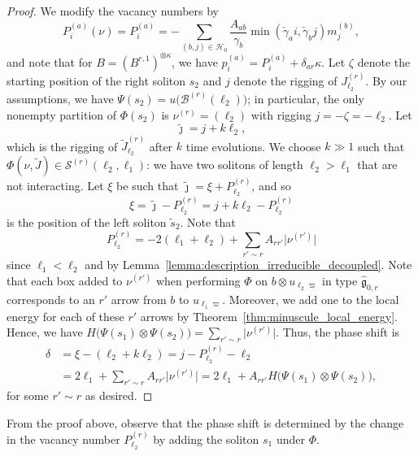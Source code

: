 \documentclass[reqno]{amsart}
\newcommand{\g}{\mathfrak{g}}
\newcommand{\HH}{\mathcal{H}}
\newcommand{\Sol}{\mathcal{S}} %
\newcommand{\modgamma}{\check{\gamma}} %
\theoremstyle{plain}
\theoremstyle{definition}
\numberwithin{equation}{section}
\begin{document}
\begin{proof}
We modify the vacancy numbers by
\[
P_i^{(a)}(\nu) = P_i^{(a)} = - \sum_{(b,j) \in \HH_0} \frac{A_{ab}}{\gamma_b} \min(\modgamma_a i, \modgamma_b j) m_j^{(b)},
\]
and note that for $B = (B^{r,1})^{\otimes \kappa}$, we have $p_i^{(a)} = P_i^{(a)} + \delta_{ar} \kappa$.
Let $\zeta$ denote the starting position of the right soliton $s_2$ and $j$ denote the rigging of $J_{\ell_2}^{(r)}$.
By our assumptions, we have $\Psi(s_2) = u\bigl(\mathcal{B}^{(r)}(\ell_2)\bigr)$; in particular, the only nonempty partition of $\Phi(s_2)$ is $\nu^{(r)} = (\ell_2)$ with rigging $j = -\zeta = -\ell_2$.
Let
\[
\widetilde{\jmath} = j + k \ell_2,
\]
which is the rigging of $\widetilde{J}_{\ell_2}^{(r)}$ after $k$ time evolutions.
We choose $k \gg 1$ such that $\Phi(\nu, \widetilde{J}) \in \Sol^{(r)}(\ell_2, \ell_1)$: we have two solitons of length $\ell_2 > \ell_1$ that are not interacting.
Let $\xi$ be such that $\widetilde{\jmath} = \xi + P_{\ell_2}^{(r)}$, and so
\[
\xi = \widetilde{\jmath} - P_{\ell_2}^{(r)} = j + k \ell_2 - P_{\ell_2}^{(r)}
\]
is the position of the left soliton $\widetilde{s}_2$.
Note that
\[
P_{\ell_2}^{(r)} = -2(\ell_1 + \ell_2) + \sum_{r' \sim r} A_{rr'} \lvert \nu^{(r')} \rvert
\]
since $\ell_1 < \ell_2$ and by Lemma~\ref{lemma:description_irreducible_decoupled}.
Note that each box added to $\nu^{(r')}$ when performing $\Phi$ on $b \otimes u_{\ell_2 \varpi}$ in type $\widehat{\g}_{0,r}$ corresponds to an $r'$ arrow from $b$ to $u_{\ell_1 \varpi}$.
Moreover, we add one to the local energy for each of these $r'$ arrows by Theorem~\ref{thm:minuscule_local_energy}.
Hence, we have $H\bigl(\Psi(s_1) \otimes \Psi(s_2)\bigr) = \sum_{r' \sim r} \lvert \nu^{(r')} \rvert$.
Thus, the phase shift is
\begin{align*}
\delta & = \xi - (\ell_2 + k\ell_2) = j - P_{\ell_2}^{(r)} - \ell_2
\\ & = 2\ell_1 + \sum_{r' \sim r} A_{rr'} \lvert \nu^{(r')} \rvert = 2\ell_1 + A_{rr'} H\bigl(\Psi(s_1) \otimes \Psi(s_2)\bigr),
\end{align*}
for some $r' \sim r$ as desired.
\end{proof}

From the proof above, observe that the phase shift is determined by the change in the vacancy number $P_{\ell_2}^{(r)}$ by adding the soliton $s_1$ under $\Phi$.
\end{document}
